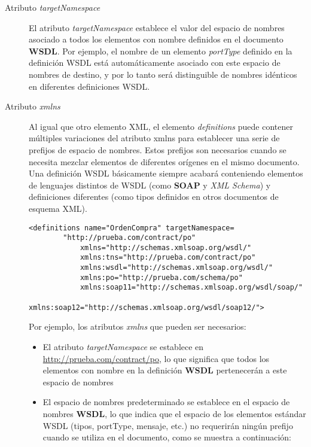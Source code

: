  \begin{description}
 	\item[Atributo \textit{targetNamespace}]  El atributo \textit{targetNamespace}   establece el valor del espacio de nombres asociado a todos los elementos con nombre definidos en el documento \textbf{WSDL}.
 	Por ejemplo, el nombre de un elemento \textit{portType} definido en la definición WSDL está automáticamente
 	asociado con este espacio de nombres de destino, y por lo tanto será distinguible de nombres idénticos en diferentes definiciones WSDL.
 	
 	\item[Atributo \textit{xmlns}] Al igual que otro elemento XML, el elemento \textit{definitions} puede contener múltiples variaciones del atributo xmlns para establecer una serie de prefijos de espacio de nombres. Estos prefijos son necesarios cuando se necesita mezclar elementos de diferentes orígenes en el mismo documento.
 	Una definición WSDL básicamente siempre acabará conteniendo elementos de lenguajes distintos de WSDL (como \textbf{SOAP} y \textit{XML Schema}) y definiciones diferentes (como tipos definidos en otros documentos de esquema XML).  
 	
 	
 	\begin{lstlisting}[label=wsdl:attr-xmlns, caption= Atributo {xmlns}. Tomado de \cite{Erl2007}]
 		<definitions name="OrdenCompra" targetNamespace=
 		"http://prueba.com/contract/po"
 			xmlns="http://schemas.xmlsoap.org/wsdl/"
 			xmlns:tns="http://prueba.com/contract/po"
 			xmlns:wsdl="http://schemas.xmlsoap.org/wsdl/"
 			xmlns:po="http://prueba.com/schema/po"
 			xmlns:soap11="http://schemas.xmlsoap.org/wsdl/soap/"
 			xmlns:soap12="http://schemas.xmlsoap.org/wsdl/soap12/">
 	\end{lstlisting}
 	
 	 Por ejemplo, los atributos \textit{xmlns} que pueden ser necesarios:
 	\begin{itemize}
 		\item  El atributo \textit{targetNamespace} se establece en \url{http://prueba.com/contract/po}, lo que significa que todos los elementos con nombre en la definición \textbf{WSDL} pertenecerán a este  espacio de nombres
 		\item  El espacio de nombres predeterminado se establece en el espacio de nombres \textbf{WSDL}, lo que indica que el espacio de los elementos estándar WSDL (tipos, portType, mensaje, etc.) no requerirán ningún prefijo  	cuando se utiliza en el documento, como se muestra a continuación:
 		

\end{itemize}
\end{description}
